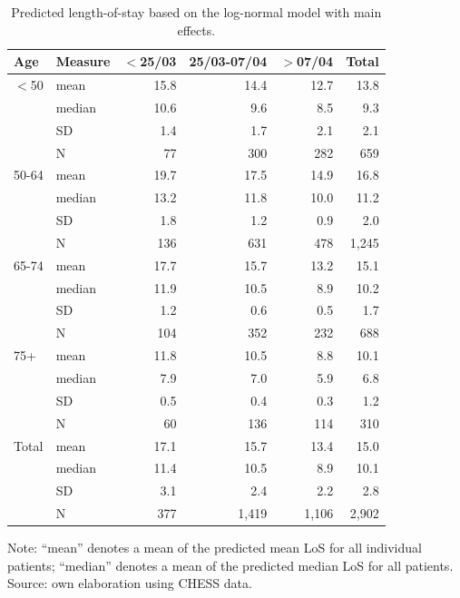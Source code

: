 \documentclass[review]{elsarticle}
\begin{document}
\begin{table}[htbp]
\caption{Predicted length-of-stay based on the log-normal model with main effects. \label{Table:LOS_estimates_main} }
\begin{center}
\begin{tabular}{llrrr|r}\toprule
Age	&	Measure	&	$<$25/03	&	25/03-07/04	&	$>$07/04	&	Total	\\\midrule
$<$50	&	mean	&	15.8	&	14.4	&	12.7	&	13.8	\\
	&	median	&	10.6	&	9.6	&	8.5	&	9.3	\\
	&	SD	&	1.4	&	1.7	&	2.1	&	2.1	\\
	&	N	&	77	&	300	&	282	&	659	\\

50-64	&	mean	&	19.7	&	17.5	&	14.9	&	16.8	\\
	&	median	&	13.2	&	11.8	&	10.0	&	11.2	\\
	&	SD	&	1.8	&	1.2	&	0.9	&	2.0	\\
	&	N	&	136	&	631	&	478	&	1,245	\\

65-74	&	mean	&	17.7	&	15.7	&	13.2	&	15.1	\\
	&	median	&	11.9	&	10.5	&	8.9	&	10.2	\\
	&	SD	&	1.2	&	0.6	&	0.5	&	1.7	\\
	&	N	&	104	&	352	&	232	&	688	\\

75+	&	mean	&	11.8	&	10.5	&	8.8	&	10.1	\\
	&	median	&	7.9	&	7.0	&	5.9	&	6.8	\\
	&	SD	&	0.5	&	0.4	&	0.3	&	1.2	\\
	&	N	&	60	&	136	&	114	&	310	\\\midrule

Total	&	mean	&	17.1	&	15.7	&	13.4	&	15.0	\\
	&	median	&	11.4	&	10.5	&	8.9	&	10.1	\\
	&	SD	&	3.1	&	2.4	&	2.2	&	2.8	\\
	&	N	&	377	&	1,419	&	1,106	&	2,902	\\\bottomrule
\end{tabular}
 \end{center}
 \scriptsize{Note: ``mean'' denotes a mean of the predicted mean LoS for all individual patients; ``median'' denotes a mean of the predicted median LoS for all patients. Source: own elaboration using CHESS data.}
 \end{table}
\end{document}
